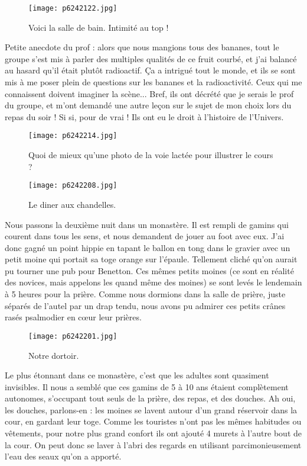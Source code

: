 \documentclass{book}
\begin{document}
\begin{figure}[h]
\centering
\texttt{[image: p6242122.jpg]}
\caption*{Voici la salle de bain. Intimité au top !}
\end{figure}

Petite anecdote du prof : alors que nous mangions tous des bananes, tout le groupe s'est mis à parler des multiples qualités de ce fruit courbé, et j'ai balancé au hasard qu'il était plutôt radioactif. Ça a intrigué tout le monde, et ils se sont mis à me poser plein de questions sur les bananes et la radioactivité. Ceux qui me connaissent doivent imaginer la scène... Bref, ils ont décrété que je serais le prof du groupe, et m'ont demandé une autre leçon sur le sujet de mon choix lors du repas du soir ! Si si, pour de vrai ! Ils ont eu le droit à l'histoire de l'Univers.




\begin{figure}[h]
\centering
\texttt{[image: p6242214.jpg]}
\caption*{Quoi de mieux qu'une photo de la voie lactée pour illustrer le cours ?}
\end{figure}


\begin{figure}[h]
\centering
\texttt{[image: p6242208.jpg]}
\caption*{Le diner aux chandelles.}
\end{figure}

Nous passons la deuxième nuit dans un monastère. Il est rempli de gamins qui courent dans tous les sens, et nous demandent de jouer au foot avec eux. J'ai donc gagné un point hippie en tapant le ballon en tong dans le gravier avec un petit moine qui portait sa toge orange sur l'épaule. Tellement cliché qu'on aurait pu tourner une pub pour Benetton. Ces mêmes petits moines (ce sont en réalité des novices, mais appelons les quand même des moines) se sont levés le lendemain à 5 heures pour la prière. Comme nous dormions dans la salle de prière, juste séparés de l'autel par un drap tendu, nous avons pu admirer ces petits crânes rasés psalmodier en cœur leur prières.




\begin{figure}[h]
\centering
\texttt{[image: p6242201.jpg]}
\caption*{Notre dortoir.}
\end{figure}

Le plus étonnant dans ce monastère, c'est que les adultes sont quasiment invisibles. Il nous a semblé que ces gamins de 5 à 10 ans étaient complètement autonomes, s'occupant tout seuls de la prière, des repas, et des douches. Ah oui, les douches, parlons-en : les moines se lavent autour d'un grand réservoir dans la cour, en gardant leur toge. Comme les touristes n'ont pas les mêmes habitudes ou vêtements, pour notre plus grand confort ils ont ajouté 4 murets à l'autre bout de la cour. On peut donc se laver à l'abri des regards en utilisant parcimonieusement l'eau des seaux qu'on a apporté.
\end{document}
